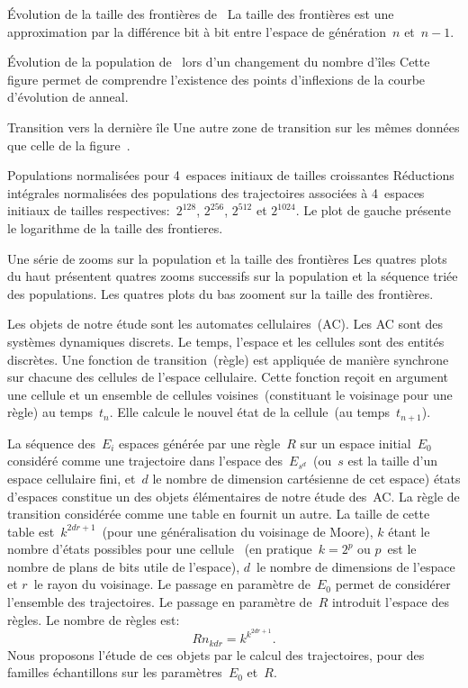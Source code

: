 %
{}%
{Évolution de la taille des frontières de~}%
{La taille des frontières est une approximation par la différence bit
  à bit entre l'espace de génération~$n$ et~$n-1$.}

%
{}%
{Évolution de la population de~ lors
  d'un changement du nombre d'îles}%
{Cette figure permet de comprendre l'existence des points d'inflexions
  de la courbe d'évolution de anneal.}

%
{}%
{Transition vers la dernière île}%
{Une autre zone de transition sur les mêmes données que celle de la
  figure~.}

%
{}%
{Populations normalisées pour 4~espaces initiaux de tailles crois\-santes}%
{Réductions intégrales normalisées des populations des trajectoires
  associées à 4~espaces initiaux de tailles respectives:~$2^{128}$,
  $2^{256}$, $2^{512}$ et $2^{1024}$. %
  Le plot de gauche présente le logarithme de la taille des frontieres.}

%
{}%
{Une série de zooms sur la population et la taille des frontières}%
{Les quatres plots du haut présentent quatres zooms successifs sur la
  population et la séquence triée des populations. %
  Les quatres plots du bas zooment sur la taille des frontières.}

Les objets de notre étude sont les automates cellulaires~(AC). %
Les AC sont des systèmes dynamiques discrets. %
Le temps, l'espace et les cellules sont des entités discrètes. %
Une fonction de transition~(règle) est appliquée de manière synchrone
sur chacune des cellules de l'espace cellulaire. %
Cette fonction reçoit en argument une cellule et un ensemble de
cellules voisines~(constituant le voisinage pour une règle) %
au temps~$t_n$. %
Elle calcule le nouvel état de la cellule~(au temps~$t_{n+1}$). %

La séquence des~$E_i$ espaces générée par une règle~$R$ sur un espace
initial~$E_0$ considéré comme une trajectoire dans l'espace
des~$E_{s^d}$~(ou~$s$ est la taille d'un espace cellulaire fini, %
et~$d$ le nombre de dimension cartésienne de cet espace) états d'espaces
constitue un des objets élémentaires de notre étude des~AC\@. %
La règle de transition considérée comme une table en fournit un autre. %
La taille de cette table est~$k^{2dr+1}$~(pour une généralisation du
voisinage de Moore), %
$k$ étant le nombre d'états possibles pour une cellule~%
(en pratique~$k=2^p$ ou $p$~est le nombre de plans de bits utile de
l'espace), $d$~le nombre de dimensions de l'espace et $r$~le rayon du
voisinage. %
Le passage en paramètre de~$E_0$ permet de considérer l'ensemble des
trajectoires. %
Le passage en paramètre de~$R$ introduit l'espace des règles. %
Le nombre de règles est:
\begin{equation}
  Rn_{kdr} = k^{k^{2dr+1}}. %
  \label{rule-count}
\end{equation}
Nous proposons l'étude de ces objets par le calcul des trajectoires,
pour des familles échantillons sur les paramètres~$E_0$ et~$R$. %

